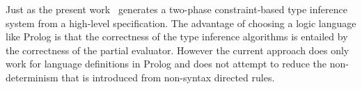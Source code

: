 Just as the present work~\cite{tomb2005automatic} generates a
two-phase constraint-based type inference system from a high-level
specification. The advantage of choosing a logic language like Prolog
is that the correctness of the type inference algorithms is entailed
by the correctness of the partial evaluator. However the current
approach does only work for language definitions in Prolog and does
not attempt to reduce the non-determinism that is introduced from
non-syntax directed rules.

